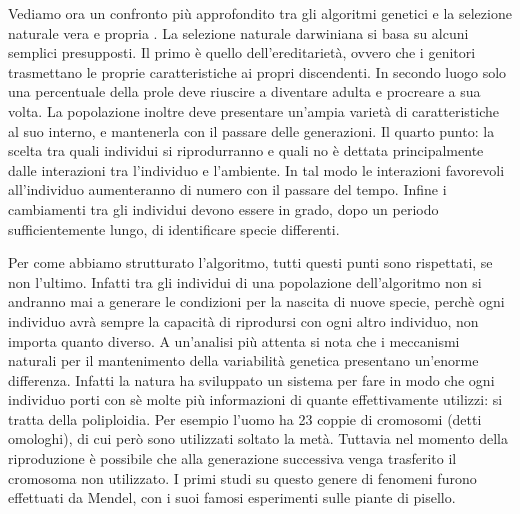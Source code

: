 \documentclass[a4paper, 11pt, onecolumn]{article}
\newcommand*{\MyMarginNoteFormat}{%
    \scriptsize \bfseries \leavevmode \color{mgray}%
}
\newcommand{\margin}[1]{%
    \marginpar
        [\raggedleft  \MyMarginNoteFormat #1]%
        {\raggedright \MyMarginNoteFormat #1}%
}
\newcommand{\slide}{\margin{Slide}}
\begin{document}
Vediamo ora un confronto pi\`u approfondito tra gli algoritmi genetici e la
selezione naturale vera e propria\slide. La selezione naturale darwiniana si
basa su alcuni semplici presupposti.\slide Il primo \`e quello
dell'ereditariet\`a, ovvero che i genitori trasmettano le proprie
caratteristiche ai propri discendenti. In secondo luogo solo una percentuale
della prole deve riuscire a diventare adulta e procreare a sua volta. La
popolazione inoltre deve presentare un'ampia variet\`a di caratteristiche al suo
interno, e mantenerla con il passare delle  generazioni. Il quarto punto: la
scelta tra quali individui si riprodurranno e  quali no \`e dettata
principalmente dalle interazioni tra l'individuo e l'ambiente. In tal modo le
interazioni favorevoli all'individuo aumenteranno di numero con  il passare del
tempo. Infine i cambiamenti tra gli individui devono essere in grado, dopo un
periodo sufficientemente lungo, di identificare specie differenti.

Per come abbiamo strutturato l'algoritmo, tutti questi punti sono rispettati, se
non l'ultimo. Infatti tra gli individui di una popolazione dell'algoritmo non si
andranno mai a generare le condizioni per la nascita di nuove specie, perch\`e
ogni individuo avr\`a sempre la capacit\`a di riprodursi con ogni altro
individuo, non importa quanto diverso. A un'analisi pi\`u attenta si nota che i
meccanismi naturali per il mantenimento della variabilit\`a genetica  presentano
un'enorme differenza. Infatti la natura ha sviluppato un sistema per  fare in
modo che ogni individuo porti con s\`e molte pi\`u informazioni di quante
effettivamente utilizzi: si tratta della poliploidia. Per esempio l'uomo ha  23
coppie di cromosomi (detti omologhi), di cui per\`o sono utilizzati soltato la
met\`a. Tuttavia nel momento della riproduzione \`e possibile che alla
generazione successiva venga trasferito il cromosoma non utilizzato. I primi
studi su questo genere di fenomeni furono effettuati da Mendel, con i suoi
famosi esperimenti sulle piante di pisello.
\end{document}
